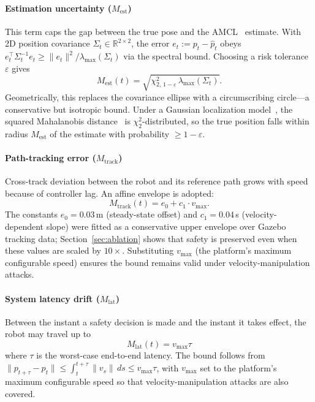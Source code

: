 \documentclass[journal,twoside,web]{ieeecolor}
\begin{document}
\paragraph{Estimation uncertainty ($M_{\mathrm{est}}$)}
This term caps the gap between the true pose and the AMCL~\cite{fox1999monte,fox2003adapting} estimate. With 2D position covariance $\Sigma_t \in \mathbb{R}^{2\times2}$, the error $e_t := p_t - \hat{p}_t$ obeys $e_t^\top \Sigma_t^{-1} e_t \ge \|e_t\|^2 / \lambda_{\max}(\Sigma_t)$ via the spectral bound. Choosing a risk tolerance $\varepsilon$ gives
\begin{equation}
M_{\mathrm{est}}(t) = \sqrt{\chi^2_{2,\,1-\varepsilon}\,\lambda_{\max}(\Sigma_t)}.
\end{equation}
Geometrically, this replaces the covariance ellipse with a circumscribing circle---a conservative but isotropic bound. Under a Gaussian localization model~\cite{thrun2005probabilistic}, the squared Mahalanobis distance~\cite{mahalanobis1936generalized} is $\chi^2_2$-distributed, so the true position falls within radius $M_{\mathrm{est}}$ of the estimate with probability $\ge 1{-}\varepsilon$.

\paragraph{Path-tracking error ($M_{\mathrm{track}}$)}
Cross-track deviation between the robot and its reference path grows with speed because of controller lag. An affine envelope is adopted:
\begin{equation}
M_{\mathrm{track}}(t) = e_0 + c_1 \cdot v_{\max}.
\end{equation}
The constants $e_0{=}0.03$\,m (steady-state offset) and $c_1{=}0.04$\,s (velocity-dependent slope) were fitted as a conservative upper envelope over Gazebo tracking data; Section~\ref{sec:ablation} shows that safety is preserved even when these values are scaled by $10\times$. Substituting $v_{\max}$ (the platform's maximum configurable speed) ensures the bound remains valid under velocity-manipulation attacks.

\paragraph{System latency drift ($M_{\mathrm{lat}}$)}
Between the instant a safety decision is made and the instant it takes effect, the robot may travel up to
\begin{equation}
M_{\mathrm{lat}}(t) = v_{\max}\tau
\end{equation}
where $\tau$ is the worst-case end-to-end latency. The bound follows from $\|p_{t+\tau}-p_t\| \le \int_t^{t+\tau}\|v_s\|\,ds \le v_{\max}\tau$, with $v_{\max}$ set to the platform's maximum configurable speed so that velocity-manipulation attacks are also covered.
\end{document}
